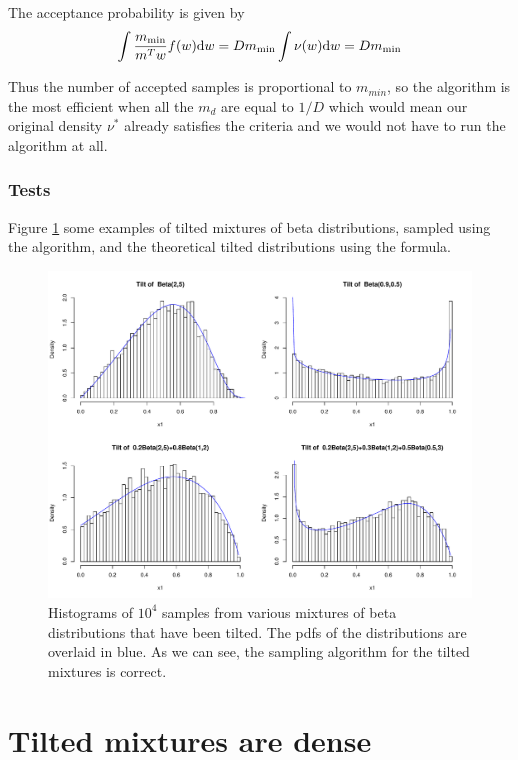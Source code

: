 The acceptance probability is given by
$$
\int \frac{m_{\min}}{m^Tw}f(w){\rm d}w = Dm_{\min} \int \nu (w) {\rm d} w = Dm_{\min}
$$

Thus the number of accepted samples is proportional to $m_{min}$, so the algorithm is the most efficient when all the $m_d$ are equal to $1/D$ which would mean our original density $\nu^*$ already satisfies the criteria and we would not have to run the algorithm at all.

\subsubsection{Tests}
Figure \ref{fig:historam_tilt} some examples of tilted mixtures of beta distributions, sampled using the algorithm, and the theoretical tilted distributions using the formula.

\begin{figure}[h]
\centering
\includegraphics[width=\textwidth]{histogram_tilt.pdf}
\caption{Histograms of $10^4$ samples from various mixtures of beta distributions that have been tilted. The pdfs of the distributions are overlaid in blue. As we can see, the sampling algorithm for the tilted mixtures is correct.}
\label{fig:historam_tilt}
\end{figure}




\section{Tilted mixtures are dense}

